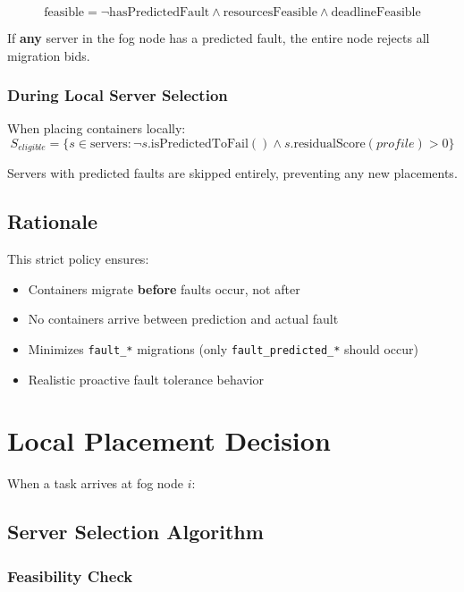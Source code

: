 \documentclass[12pt,a4paper]{article}
\begin{document}
\begin{equation}
    \text{feasible} = \neg \text{hasPredictedFault} \land \text{resourcesFeasible} \land \text{deadlineFeasible}
\end{equation}

If \textbf{any} server in the fog node has a predicted fault, the entire node rejects all migration bids.

\subsubsection{During Local Server Selection}

When placing containers locally:
\begin{equation}
    S_{eligible} = \{s \in \text{servers} : \neg s.\text{isPredictedToFail}() \land s.\text{residualScore}(profile) > 0\}
\end{equation}

Servers with predicted faults are skipped entirely, preventing any new placements.

\subsection{Rationale}

This strict policy ensures:
\begin{itemize}
    \item Containers migrate \textbf{before} faults occur, not after
    \item No containers arrive between prediction and actual fault
    \item Minimizes \texttt{fault\_*} migrations (only \texttt{fault\_predicted\_*} should occur)
    \item Realistic proactive fault tolerance behavior
\end{itemize}

\section{Local Placement Decision}

When a task arrives at fog node $i$:

\subsection{Server Selection Algorithm}

\subsubsection{Feasibility Check}
\end{document}
